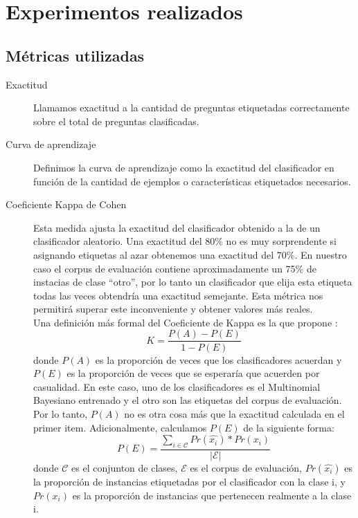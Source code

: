 \section{Experimentos realizados}



\subsection{Métricas utilizadas}
\begin{description}
    \item[Exactitud] Llamamos exactitud a la cantidad de preguntas etiquetadas correctamente sobre el total de preguntas clasificadas.
    \item[Curva de aprendizaje] Definimos la curva de aprendizaje como la exactitud del clasificador en función de la cantidad de ejemplos o características etiquetados necesarios.
    \item [Coeficiente Kappa de Cohen] Esta medida ajusta la exactitud del clasificador obtenido a la de un clasificador aleatorio. Una exactitud del 80\% no es muy sorprendente si asignando etiquetas al azar obtenemos una exactitud del 70\%. En nuestro caso el corpus de evaluación contiene aproximadamente un 75\% de instacias de clase ``otro'', por lo tanto un clasificador que elija esta etiqueta todas las veces obtendría una exactitud semejante. Esta métrica nos permitirá superar este inconveniente y obtener valores más reales.\\
    Una definición más formal del Coeficiente de Kappa es la que propone \citet{KappaCarletta}:
    $$K = \frac{P(A)-P(E)}{1-P(E)}$$
    donde $P(A)$ es la proporción de veces que los clasificadores acuerdan y $P(E)$ es la proporción de veces que se esperaría que acuerden por casualidad. En este caso, uno de los clasificadores es el Multinomial Bayesiano entrenado y el otro son las etiquetas del corpus de evaluación. Por lo tanto, $P(A)$ no es otra cosa más que la exactitud calculada en el primer item. Adicionalmente, calculamos $P(E)$ de la siguiente forma:
    $$P(E) = \frac{\sum_{i\in\mathcal{C}}Pr(\hat{x_i})*Pr(x_i)}{|\mathcal{E}|}$$
    donde $\mathcal{C}$ es el conjunton de clases, $\mathcal{E}$ es el corpus de evaluación, $Pr(\hat{x_i})$ es la proporción de instancias etiquetadas por el clasificador con la clase i, y $Pr(x_i)$ es la proporción de instancias que pertenecen realmente a la clase i.

\end{description}
